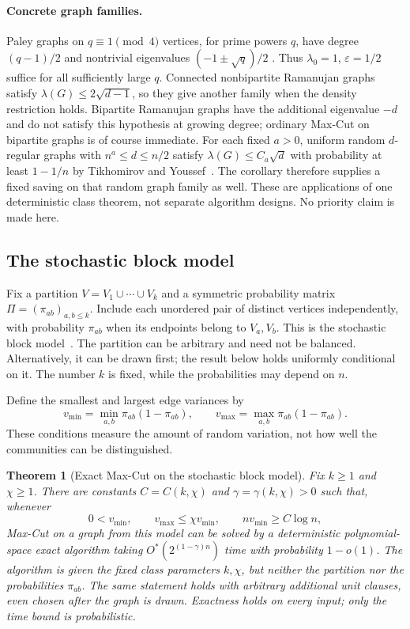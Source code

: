 \documentclass[11pt,a4paper]{article}
\newtheorem{theorem}{Theorem}[section]
\theoremstyle{definition}
\theoremstyle{remark}
\newcommand{\Ostar}{O^{*}}
\begin{document}
\paragraph{Concrete graph families.}
Paley graphs on $q\equiv1\pmod4$ vertices, for prime powers $q$, have
degree $(q-1)/2$ and nontrivial eigenvalues $(-1\pm\sqrt q)/2$
\cite[Section~9.1.2]{BH12}. Thus $\lambda_0=1$, $\varepsilon=1/2$
suffice for all sufficiently large $q$. Connected nonbipartite Ramanujan
graphs satisfy $\lambda(G)\le2\sqrt{d-1}$, so they give another family
when the density restriction holds. Bipartite Ramanujan graphs have the
additional eigenvalue $-d$ and do not satisfy this hypothesis at growing
degree; ordinary Max-Cut on bipartite graphs is of course immediate.
For each fixed $a>0$, uniform random $d$-regular graphs with
$n^a\le d\le n/2$ satisfy $\lambda(G)\le C_a\sqrt d$ with probability
at least $1-1/n$ by Tikhomirov and Youssef~\cite{TY19}. The corollary
therefore supplies a fixed saving on that random graph family as well.
These are applications of one deterministic class theorem, not separate
algorithm designs. No priority claim is made here.


\subsection{The stochastic block model}\label{sec:sbm}

Fix a partition $V=V_1\cup\cdots\cup V_k$ and a symmetric probability
matrix $\Pi=(\pi_{ab})_{a,b\le k}$. Include each unordered pair of distinct
vertices independently, with probability $\pi_{ab}$ when its endpoints
belong to $V_a,V_b$. This is the stochastic block model~\cite{Abbe18}.
The partition can be arbitrary and need not be balanced. Alternatively,
it can be drawn first; the result below holds uniformly conditional on it.
The number $k$ is fixed, while the probabilities may depend on $n$.

Define the smallest and largest edge variances by
\[
 v_{\min}=\min_{a,b}\pi_{ab}(1-\pi_{ab}),\qquad
 v_{\max}=\max_{a,b}\pi_{ab}(1-\pi_{ab}).
\]
These conditions measure the amount of random variation, not how well
the communities can be distinguished.

\begin{theorem}[Exact Max-Cut on the stochastic block model]\label{thm:sbm}
Fix $k\ge1$ and $\chi\ge1$. There are constants $C=C(k,\chi)$ and
$\gamma=\gamma(k,\chi)>0$ such that, whenever
\begin{equation}
 0<v_{\min},\qquad v_{\max}\le\chi v_{\min},\qquad
 n v_{\min}\ge C\log n,                       \label{eq:sbmvariance}
\end{equation}
Max-Cut on a graph from this model can be solved by a deterministic
polynomial-space exact algorithm taking
$\Ostar(2^{(1-\gamma)n})$ time with probability $1-o(1)$.
The algorithm is given the fixed class parameters $k,\chi$, but neither
the partition nor the probabilities $\pi_{ab}$. The same statement holds
with arbitrary additional unit clauses, even chosen after the graph is
drawn. Exactness holds on every input; only the time bound is probabilistic.
\end{theorem}
\end{document}
